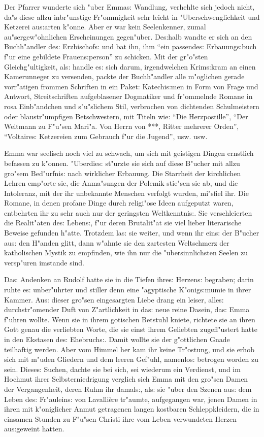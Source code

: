 \documentclass[oneside,12pt]{book}
\newcommand{\s}{s:}%
\begin{document}
Der Pfarrer wunderte sich "uber Emma{\s} Wandlung, verhehlte sich
jedoch nicht, da"s diese allzu inbr"unstige Fr"ommigkeit sehr
leicht in "Uberschwenglichkeit und Ketzerei au{\s}arten k"onne.
Aber er war kein Seelenkenner, zumal au"sergew"ohnlichen
Erscheinungen gegen"uber. De{\s}halb wandte er sich an den
Buchh"andler de{\s} Erzbischof{\s} und bat ihn, ihm "`ein
passende{\s} Erbauung{\s}buch f"ur eine gebildete
Frauen{\s}person"' zu schicken. Mit der gr"o"sten
Gleichg"ultigkeit, al{\s} handle e{\s} sich darum, irgendwelchen
Krim{\s}kram an einen Kamerunneger zu versenden, packte der
Buchh"andler alle m"oglichen gerade vorr"atigen frommen Schriften
in ein Paket: Katechi{\s}men in Form von Frage und Antwort,
Streitschriften aufgeblasener Dogmatiker und fr"ommelnde Romane in
rosa Einb"andchen und s"u"slichem Stil, verbrochen von dichtenden
Schulmeistern oder blaustr"umpfigen Betschwestern, mit Titeln wie:
"`Die Herzpostille"', "`Der Weltmann zu F"u"sen Mari"a. Von Herrn
von ***, Ritter mehrerer Orden"', "`Voltaire{\s} Ketzereien zum
Gebrauch f"ur die Jugend"', usw. usw.

Emma war seelisch noch viel zu schwach, um sich mit geistigen
Dingen ernstlich befassen zu k"onnen. "Uberdie{\s} st"urzte sie
sich auf diese B"ucher mit allzu gro"sem Bed"urfni{\s} nach
wirklicher Erbauung. Die Starrheit der kirchlichen Lehren emp"orte
sie, die Anma"sungen der Polemik stie"sen sie ab, und die
Intoleranz, mit der ihr unbekannte Menschen verfolgt wurden,
mi"sfiel ihr. Die Romane, in denen profane Dinge durch religi"ose
Ideen aufgeputzt waren, entbehrten ihr zu sehr auch nur der
geringsten Weltkenntni{\s}. Sie verschleierten die Realit"aten
de{\s} Leben{\s}, f"ur deren Brutalit"at sie viel lieber
literarische Beweise gefunden h"atte. Trotzdem la{\s} sie weiter,
und wenn ihr ein{\s} der B"ucher au{\s} den H"anden glitt, dann
w"ahnte sie den zartesten Weltschmerz der katholischen Mystik zu
empfinden, wie ihn nur die "ubersinnlichsten Seelen zu versp"uren
imstande sind.

Da{\s} Andenken an Rudolf hatte sie in die Tiefen ihre{\s}
Herzen{\s} begraben; darin ruhte e{\s} unber"uhrter und stiller
denn eine "agyptische K"onig{\s}mumie in ihrer Kammer. Au{\s}
dieser gro"sen eingesargten Liebe drang ein leiser, alle{\s}
durchstr"omender Duft von Z"artlichkeit in da{\s} neue reine
Dasein, da{\s} Emma f"uhren wollte. Wenn sie in ihrem gotischen
Betstuhl kniete, richtete sie an ihren Gott genau die verliebten
Worte, die sie einst ihrem Geliebten zugefl"ustert hatte in den
Ekstasen de{\s} Ehebruch{\s}. Damit wollte sie der g"ottlichen
Gnade teilhaftig werden. Aber vom Himmel her kam ihr keine
Tr"ostung, und sie erhob sich mit m"uden Gliedern und dem leeren
Gef"uhl, namenlo{\s} betrogen worden zu sein. Diese{\s} Suchen,
dachte sie bei sich, sei wiederum ein Verdienst, und im Hochmut
ihrer Selbsterniedrigung verglich sich Emma mit den gro"sen Damen
der Vergangenheit, deren Ruhm ihr damal{\s}, al{\s} sie "uber den
Szenen au{\s} dem Leben de{\s} Fr"aulein{\s} von Lavalli\`ere
tr"aumte, aufgegangen war, jenen Damen in ihren mit k"oniglicher
Anmut getragenen langen kostbaren Schleppkleidern, die in einsamen
Stunden zu F"u"sen Christi ihre vom Leben verwundeten Herzen
au{\s}geweint hatten.
\end{document}
